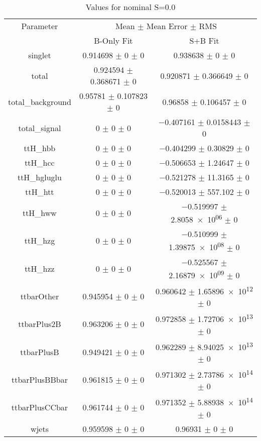 \begin{table}
\centering
\caption{Values for nominal S=0.0}
\begin{tabular}{ccc}
\toprule
Parameter & \multicolumn{2}{c}{Mean $\pm$ Mean Error $\pm$ RMS}\\
 & B-Only Fit & S+B Fit\\
\midrule
singlet & \num{0.914698} $\pm$ \num{0} $\pm$ \num{0} & \num{0.938638} $\pm$ \num{0} $\pm$ \num{0}\\
total & \num{0.924594} $\pm$ \num{0.368671} $\pm$ \num{0} & \num{0.920871} $\pm$ \num{0.366649} $\pm$ \num{0}\\
total\_background & \num{0.95781} $\pm$ \num{0.107823} $\pm$ \num{0} & \num{0.96858} $\pm$ \num{0.106457} $\pm$ \num{0}\\
total\_signal & \num{0} $\pm$ \num{0} $\pm$ \num{0} & \num{-0.407161} $\pm$ \num{0.0158443} $\pm$ \num{0}\\
ttH\_hbb & \num{0} $\pm$ \num{0} $\pm$ \num{0} & \num{-0.404299} $\pm$ \num{0.30829} $\pm$ \num{0}\\
ttH\_hcc & \num{0} $\pm$ \num{0} $\pm$ \num{0} & \num{-0.506653} $\pm$ \num{1.24647} $\pm$ \num{0}\\
ttH\_hgluglu & \num{0} $\pm$ \num{0} $\pm$ \num{0} & \num{-0.521278} $\pm$ \num{11.3165} $\pm$ \num{0}\\
ttH\_htt & \num{0} $\pm$ \num{0} $\pm$ \num{0} & \num{-0.520013} $\pm$ \num{557.102} $\pm$ \num{0}\\
ttH\_hww & \num{0} $\pm$ \num{0} $\pm$ \num{0} & \num{-0.519997} $\pm$ \num{2.8058e+06} $\pm$ \num{0}\\
ttH\_hzg & \num{0} $\pm$ \num{0} $\pm$ \num{0} & \num{-0.510999} $\pm$ \num{1.39875e+08} $\pm$ \num{0}\\
ttH\_hzz & \num{0} $\pm$ \num{0} $\pm$ \num{0} & \num{-0.525567} $\pm$ \num{2.16879e+09} $\pm$ \num{0}\\
ttbarOther & \num{0.945954} $\pm$ \num{0} $\pm$ \num{0} & \num{0.960642} $\pm$ \num{1.65896e+12} $\pm$ \num{0}\\
ttbarPlus2B & \num{0.963206} $\pm$ \num{0} $\pm$ \num{0} & \num{0.972858} $\pm$ \num{1.72706e+13} $\pm$ \num{0}\\
ttbarPlusB & \num{0.949421} $\pm$ \num{0} $\pm$ \num{0} & \num{0.962289} $\pm$ \num{8.94025e+13} $\pm$ \num{0}\\
ttbarPlusBBbar & \num{0.961815} $\pm$ \num{0} $\pm$ \num{0} & \num{0.971302} $\pm$ \num{2.73786e+14} $\pm$ \num{0}\\
ttbarPlusCCbar & \num{0.961744} $\pm$ \num{0} $\pm$ \num{0} & \num{0.971352} $\pm$ \num{5.88938e+14} $\pm$ \num{0}\\
wjets & \num{0.959598} $\pm$ \num{0} $\pm$ \num{0} & \num{0.96931} $\pm$ \num{0} $\pm$ \num{0}\\
\bottomrule
\end{tabular}
\end{table}